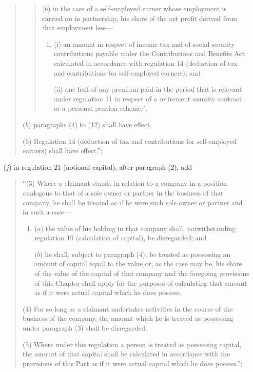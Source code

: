 \documentclass[12pt,a4paper]{article}
\begin{document}
\begin{enumerate}
\begin{quotation}
\begin{enumerate}
\begin{quotation}
\begin{enumerate}
($b$) in the case of a self-employed earner whose employment is carried on in partnership, his share of the net profit derived from that employment less—
\begin{enumerate}\item[]
(i) an amount in respect of income tax and of social security contributions payable under the Contributions and Benefits Act calculated in accordance with regulation 14 (deduction of tax and contributions for self-employed earners); and

(ii) one half of any premium paid in the period that is relevant under regulation 11 in respect of a retirement annuity contract or a personal pension scheme.”;
\end{enumerate}
\end{enumerate}
\end{quotation}

($b$) paragraphs (4) to (12) shall have effect.
\end{enumerate}

(6) Regulation 14 (deduction of tax and contributions for self-employed earners) shall have effect.”;
\end{quotation}

($j$) in regulation 21 (notional capital), after paragraph (2), add—
\begin{quotation}
“(3) Where a claimant stands in relation to a company in a position analogous to that of a sole owner or partner in the business of that company, he shall be treated as if he were such sole owner or partner and in such a case—
\begin{enumerate}\item[]
($a$) the value of his holding in that company shall, notwithstanding regulation 19 (calculation of capital), be disregarded; and

($b$) he shall, subject to paragraph (4), be treated as possessing an amount of capital equal to the value or, as the case may be, his share of the value of the capital of that company and the foregoing provisions of this Chapter shall apply for the purposes of calculating that amount as if it were actual capital which he does possess.
\end{enumerate}

(4) For so long as a claimant undertakes activities in the course of the business of the company, the amount which he is treated as possessing under paragraph (3) shall be disregarded.

(5) Where under this regulation a person is treated as possessing capital, the amount of that capital shall be calculated in accordance with the provisions of this Part as if it were actual capital which he does possess.”;
\end{quotation}


\end{enumerate}
\end{document}
